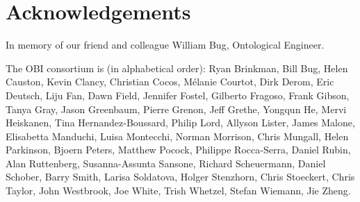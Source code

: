 \documentclass[a4paper,10pt,twocolumn]{article}
\begin{document}
\section*{Acknowledgements}

In memory of our friend and colleague William Bug, Ontological Engineer. 

The OBI consortium is (in alphabetical order): Ryan Brinkman, Bill Bug, Helen Causton, Kevin Clancy, Christian Cocos, M\'elanie Courtot, Dirk Derom, Eric Deutsch, Liju Fan, Dawn Field, Jennifer Fostel, Gilberto Fragoso, Frank Gibson, Tanya Gray, Jason Greenbaum, Pierre Grenon, Jeff Grethe, Yongqun He, Mervi Heiskanen, Tina Hernandez-Boussard, Philip Lord, Allyson Lister, James Malone, Elisabetta Manduchi, Luisa Montecchi, Norman Morrison, Chris Mungall, Helen Parkinson, Bjoern Peters, Matthew Pocock, Philippe Rocca-Serra, Daniel Rubin, Alan Ruttenberg, Susanna-Assunta Sansone, Richard Scheuermann, Daniel Schober, Barry Smith, Larisa Soldatova, Holger Stenzhorn, Chris Stoeckert, Chris Taylor, John Westbrook,  Joe White, Trish Whetzel, Stefan Wiemann, Jie Zheng. 

   



  \balance
\end{document}
